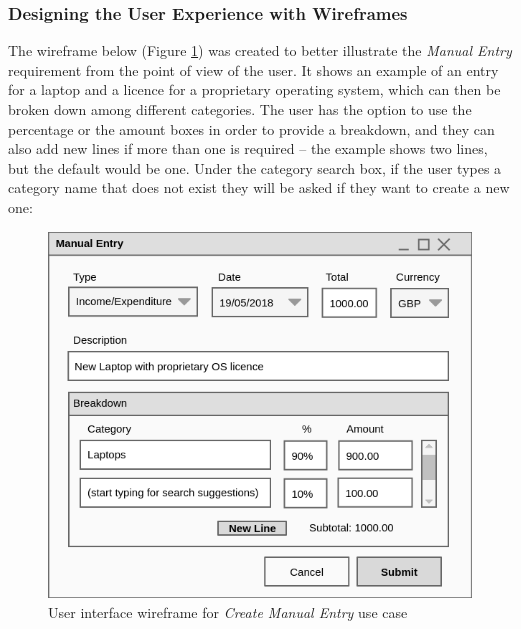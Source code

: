 \subsubsection{Designing the User Experience with Wireframes}
The wireframe below (Figure \ref{fig:Wireframe.CreateManualEntry}) was created
to better illustrate the \emph{Manual Entry} requirement from the point of view
of the user. It shows an example of an entry for a laptop and a licence for a
proprietary operating system, which can then be broken down among different
categories. The user has the option to use the percentage or the amount boxes
in order to provide a breakdown, and they can also add new lines if more than
one is required -- the example shows two lines, but the default would be one.
Under the category search box, if the user types a category name that does not
exist they will be asked if they want to create a new one:
\begin{figure}[ht!]
  \begin{center}
    \includegraphics[width=14cm]{./contents/img/Wireframe_-_Manual_Entry.png}
  \end{center}
  \caption{User interface wireframe for \emph{Create Manual Entry} use case}
  \label{fig:Wireframe.CreateManualEntry}
\end{figure}
\FloatBarrier

